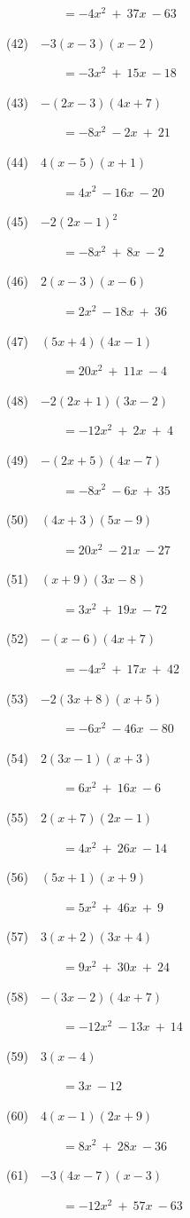 \documentclass[a4j,twocolumn,10pt,fleqn]{jarticle}
\begin{document}
~~~~~~~~~$=-4x^2~+~37x~-63$

(42)~~$-3(x-3)(x-2)$

~~~~~~~~~$=-3x^2~+~15x~-18$

(43)~~$-(2x-3)(4x+7)$

~~~~~~~~~$=-8x^2~-2x~+~21$

(44)~~$4(x-5)(x+1)$

~~~~~~~~~$=4x^2~-16x~-20$

(45)~~$-2(2x-1)^2$

~~~~~~~~~$=-8x^2~+~8x~-2$

(46)~~$2(x-3)(x-6)$

~~~~~~~~~$=2x^2~-18x~+~36$

(47)~~$(5x+4)(4x-1)$

~~~~~~~~~$=20x^2~+~11x~-4$

(48)~~$-2(2x+1)(3x-2)$

~~~~~~~~~$=-12x^2~+~2x~+~4$

(49)~~$-(2x+5)(4x-7)$

~~~~~~~~~$=-8x^2~-6x~+~35$

(50)~~$(4x+3)(5x-9)$

~~~~~~~~~$=20x^2~-21x~-27$

(51)~~$(x+9)(3x-8)$

~~~~~~~~~$=3x^2~+~19x~-72$

(52)~~$-(x-6)(4x+7)$

~~~~~~~~~$=-4x^2~+~17x~+~42$

(53)~~$-2(3x+8)(x+5)$

~~~~~~~~~$=-6x^2~-46x~-80$

(54)~~$2(3x-1)(x+3)$

~~~~~~~~~$=6x^2~+~16x~-6$

(55)~~$2(x+7)(2x-1)$

~~~~~~~~~$=4x^2~+~26x~-14$

(56)~~$(5x+1)(x+9)$

~~~~~~~~~$=5x^2~+~46x~+~9$

(57)~~$3(x+2)(3x+4)$

~~~~~~~~~$=9x^2~+~30x~+~24$

(58)~~$-(3x-2)(4x+7)$

~~~~~~~~~$=-12x^2~-13x~+~14$

(59)~~$3(x-4)$

~~~~~~~~~$=3x~-12$

(60)~~$4(x-1)(2x+9)$

~~~~~~~~~$=8x^2~+~28x~-36$

(61)~~$-3(4x-7)(x-3)$

~~~~~~~~~$=-12x^2~+~57x~-63$
\end{document}
